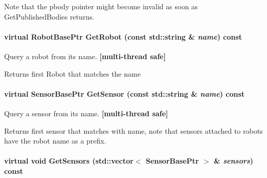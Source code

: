 Note that the pbody pointer might become invalid as soon as GetPublishedBodies returns. \hypertarget{classOpenRAVE_1_1EnvironmentBase_a97772e0635e9a310288a9a47977d81f2}{
\paragraph[{GetRobot}]{\setlength{\rightskip}{0pt plus 5cm}virtual RobotBasePtr GetRobot (const std::string \& {\em name}) const}\hfill}
\label{classOpenRAVE_1_1EnvironmentBase_a97772e0635e9a310288a9a47977d81f2}


Query a robot from its name. {\bfseries \mbox{[}multi-\/thread safe\mbox{]}} 

\begin{DoxyReturn}{Returns}
first Robot that matches the name 
\end{DoxyReturn}
\hypertarget{classOpenRAVE_1_1EnvironmentBase_a44f7b20622f42251dcdec78911f0fb20}{
\paragraph[{GetSensor}]{\setlength{\rightskip}{0pt plus 5cm}virtual SensorBasePtr GetSensor (const std::string \& {\em name}) const}\hfill}
\label{classOpenRAVE_1_1EnvironmentBase_a44f7b20622f42251dcdec78911f0fb20}


Query a sensor from its name. {\bfseries \mbox{[}multi-\/thread safe\mbox{]}} 

\begin{DoxyReturn}{Returns}
first sensor that matches with name, note that sensors attached to robots have the robot name as a prefix. 
\end{DoxyReturn}
\hypertarget{classOpenRAVE_1_1EnvironmentBase_aff29a5df3c89628089351e9cb68b474e}{
\paragraph[{GetSensors}]{\setlength{\rightskip}{0pt plus 5cm}virtual void GetSensors (std::vector$<$ SensorBasePtr $>$ \& {\em sensors}) const}\hfill}
\label{classOpenRAVE_1_1EnvironmentBase_aff29a5df3c89628089351e9cb68b474e}


